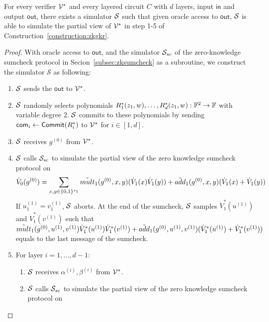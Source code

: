 \begin{theorem}\label{thm:zkgkr}
	For every verifier $\V^*$ and every layered circuit $C$ with $d$ layers, input $\mathsf{in}$ and output $\mathsf{out}$, there exists a simulator $\S$ such that given oracle access to $\mathsf{out}$, $\S$ is able to simulate the partial view of $\V^*$ in step 1-5 of Construction~\ref{construction:zkgkr}. 
\end{theorem}

\begin{proof} With oracle access to $\mathsf{out}$, and the simulator $\S_{sc}$ of the zero-knowledge sumcheck protocol in Secion~\ref{subsec:zksumcheck} as a subroutine, we construct the simulator $\mathcal{S}$ as following:

\begin{enumerate}

\item $\S$ sends the $\mathsf{out}$ to $\V^*$.

\item $\S$ randomly selects polynomials $R^*_1(z_1, w), \ldots, R^*_d(z_1, w): \F^2\rightarrow \F$ with variable degree 2. $\S$ commits to these polynomials by sending $\comm_i\leftarrow\Commit(R^*_i)$ to $\V^*$ for $i\in[1,d]$.

\item $\S$ receives $g^{(0)}$ from $\V^*$.

\item $\S$ calls $\S_{sc}$ to simulate the partial view of the zero knowledge sumcheck protocol on 
\[
\dot{V}_{0}(g^{(0)})=\sum_{x, y\in \binary^{s_{1}}}\tilde{mult}_{1}(g^{(0)}, x, y)(\dot{V}_{1}(x)\dot{V}_{1}(y))+\tilde{add}_{1}(g^{(0)},x,y)(\dot{V}_{1}(x)+\dot{V}_{1}(y))
\]
If $u_1^{(1)} = v_1^{(1)}$, $\S$ aborts. At the end of the sumcheck, $\S$ samples $\dot{V}^*_1(u^{(1)})$ and $\dot{V}^*_1(v^{(1)})$ such that $\tmult_1(g^{(0)},u^{(1)},v^{(1)})\dot{V}^*_1(u^{(1)})\dot{V}^*_1(v^{(1)})+\tadd_1(g^{(0)},u^{(1)},v^{(1)})(\dot{V}^*_1(u^{(1)})+\dot{V}^*_1(v^{(1)}))$ equals to the last message of the sumcheck.

\item For layer $i=1,\ldots,d-1$:
	\begin{enumerate}
	\item $\S$ receives $\alpha^{(i)}, \beta^{(i)}$ from $\V^*$.
	\item $\S$ calls $\S_{sc}$ to simulate the partial view of the zero knowledge sumcheck protocol on \\
	

\end{enumerate}
\end{enumerate}
\end{proof}

